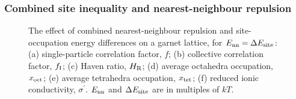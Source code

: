 \documentclass[aps,prb,twocolumn,superscriptaddress,reprint]{revtex4-1}
\begin{document}
\subsubsection{Combined site inequality and nearest-neighbour repulsion}

\begin{figure}[tb]
  \centering
    \caption{\label{fig:both_energies_data}The effect of combined nearest-neighbour repulsion and site-occupation energy differences on a garnet lattice, for $E_{\mathrm{nn}}=\Delta E_{\mathrm{site}}$: (a) single-particle correlation factor, $f$; (b) collective correlation factor, $f_{\mathrm{I}}$; (c) Haven ratio, $H_{\mathrm{R}}$; (d) average octahedra occupation, $x_{\mathrm{oct}}$; (e) average tetrahedra occupation, $x_{\mathrm{tet}}$; (f) reduced ionic conductivity, $\sigma^\prime$. $E_{\mathrm{nn}}$ and $\Delta E_{\mathrm{site}}$ are in multiples of $kT$.}
\end{figure}
\end{document}
